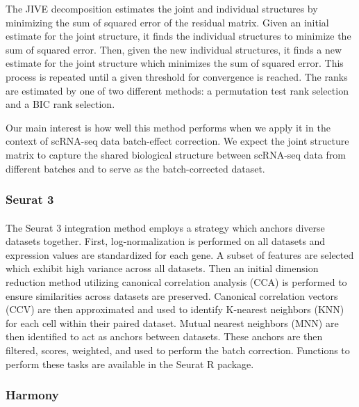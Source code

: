 \documentclass[
12pt, %
letterpaper, %
oneside, %
headinclude,footinclude, %
BCOR5mm, %
]{scrartcl}
\begin{document}
The JIVE decomposition estimates the joint and individual structures by minimizing the sum of squared error of the residual matrix. Given an initial estimate for the joint structure, it finds the individual structures to minimize the sum of squared error. Then, given the new individual structures, it finds a new estimate for the joint structure which minimizes the sum of squared error. This process is repeated until a given threshold for convergence is reached. The ranks are estimated by one of two different methods: a permutation test rank selection and a BIC rank selection.

Our main interest is how well this method performs when we apply it in the context of scRNA-seq data batch-effect correction. We expect the joint structure matrix to capture the shared biological structure between scRNA-seq data from different batches and to serve as the batch-corrected dataset.

\subsubsection*{Seurat 3}

\paragraph*{}
The Seurat 3 integration method \citep{stuart2019comprehensive} employs a strategy which anchors diverse datasets together. First, log-normalization is performed on all datasets and expression values are standardized for each gene. A subset of features are selected which exhibit high variance across all datasets. Then an initial dimension reduction method utilizing canonical correlation analysis (CCA) is performed to ensure similarities across datasets are preserved. Canonical correlation vectors (CCV) are then approximated and used to identify K-nearest neighbors (KNN) for each cell within their paired dataset. Mutual nearest neighbors (MNN) are then identified to act as anchors between datasets. These anchors are then filtered, scores, weighted, and used to perform the batch correction. Functions to perform these tasks are available in the Seurat R package.

\subsubsection*{Harmony}
\end{document}
